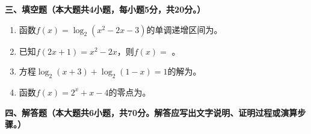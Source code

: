 \documentclass[12pt, a4paper]{ctexart}
\newcommand{\blank}[1]{\underline{\hspace{#1}}}
\begin{document}
\vspace{1em}

\noindent\textbf{三、填空题（本大题共4小题，每小题5分，共20分。）}

\begin{enumerate}[start=13]
\item 函数$f(x)=\log_2(x^2-2x-3)$的单调递增区间为\blank{3cm}。

\item 已知$f(2x+1)=x^2-2x$，则$f(x)=$ \blank{4cm}。

\item 方程$\log_2(x+3)+\log_2(1-x)=1$的解为\blank{2cm}。

\item 函数$f(x)=2^x+x-4$的零点为\blank{2cm}。
\end{enumerate}

\vspace{1em}

\noindent\textbf{四、解答题（本大题共6小题，共70分。解答应写出文字说明、证明过程或演算步骤。）}
\end{document}
